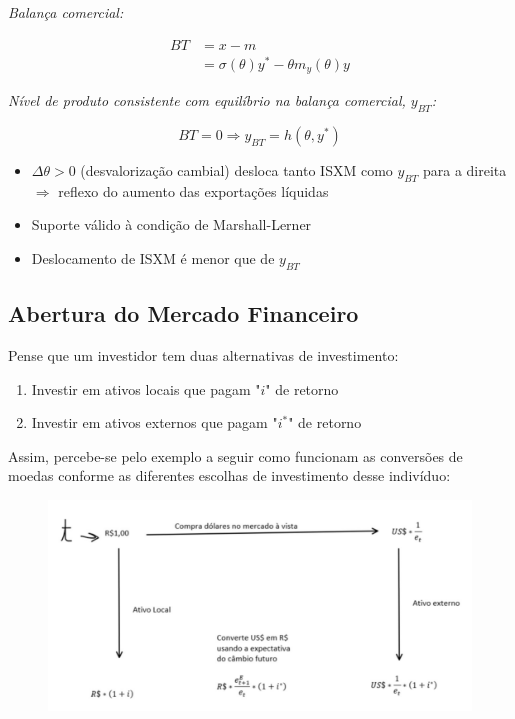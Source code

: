 \documentclass[a4paper,12pt]{article}[abntex2]
\begin{document}
\textit{Balança comercial:}

\begin{align*}
BT &= x - m \\
   &= \sigma(\theta)y^* - \theta m_y(\theta)y
\end{align*}

\textit{Nível de produto consistente com equilíbrio na balança comercial, $y_{BT}$:}

\[
BT = 0 \Longrightarrow y_{BT} = h(\theta, y^*)
\]

\begin{itemize}
  \item $\Delta \theta > 0$ (desvalorização cambial) desloca tanto ISXM como $y_{BT}$ para a direita \\
  \quad $\Rightarrow$ reflexo do aumento das exportações líquidas
  \item Suporte válido à condição de Marshall-Lerner
  \item Deslocamento de ISXM é menor que de $y_{BT}$
\end{itemize}


\subsection{\textbf{Abertura do Mercado Financeiro}}

Pense que um investidor tem duas alternativas de investimento:
\begin{enumerate}
  \item Investir em ativos locais que pagam "$i$" de retorno
  \item Investir em ativos externos que pagam "$i^*$" de retorno
\end{enumerate}

Assim, percebe-se pelo exemplo a seguir como funcionam as conversões de moedas conforme as diferentes escolhas de investimento desse indivíduo:

\begin{figure}
    \centering
    \includegraphics[width=0.75\linewidth]{Imagens/a22i2.png}
\end{figure}
\end{document}
